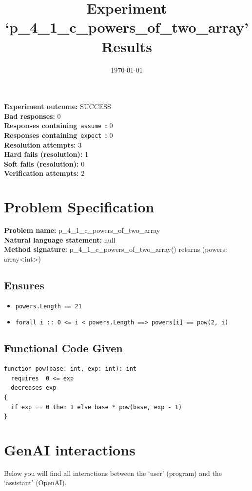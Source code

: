 \documentclass{article}
\begin{document}
\title{Experiment `p\_4\_1\_c\_powers\_of\_two\_array' Results}
\author{\today}
\date{}
\maketitle
\textbf{Experiment outcome: }SUCCESS
\\\textbf{Bad responses: }0
\\\textbf{Responses containing}~\texttt{assume}~\textbf{: }0
\\\textbf{Responses containing}~\texttt{expect}~\textbf{: }0
\\\textbf{Resolution attempts: }3
\\\textbf{Hard fails (resolution): }1
\\\textbf{Soft fails (resolution): }0
\\\textbf{Verification attempts: }2
\section*{Problem Specification}
\textbf{Problem name: }p\_4\_1\_c\_powers\_of\_two\_array
\\\textbf{Natural language statement: }null
\\\textbf{Method signature: }p\_4\_1\_c\_powers\_of\_two\_array() returns (powers: array<int>)
\subsection*{Ensures}
\begin{itemize}
\item \texttt{powers.Length == 21}
\item \texttt{forall i :: 0 <= i < powers.Length ==> powers[i] == pow(2, i)}
\end{itemize}
\subsection*{Functional Code Given}
\begin{lstlisting}
function pow(base: int, exp: int): int
  requires  0 <= exp
  decreases exp
{
  if exp == 0 then 1 else base * pow(base, exp - 1)
}
\end{lstlisting}
\clearpage
\section*{GenAI interactions}
Below you will find all interactions between the `user' (program) and the `assistant' (OpenAI).
\end{document}
